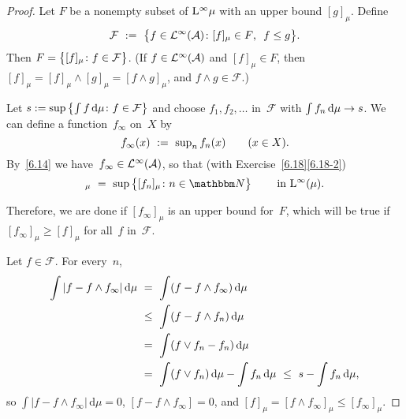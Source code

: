 \documentclass[main.tex]{subfiles}
\begin{document}
\begin{proof}
Let $F$ be a nonempty subset of $\mathrm{L}^\infty{\mu}$
with an upper bound $[g]_\mu$.
Define
\begin{equation*}
\mathcal{F}\ :=\ \bigl\{ f\in\mathcal{L}^\infty(\mathcal{A})\colon
  [f]_\mu\in F\text{, }\ f\leq g\bigr\}\text{.}
\end{equation*}
Then $F=\smash{\bigl\{[f]_\mu\colon f\in\mathcal F\bigr\}}$.
(If $f\in\mathcal{L}^\infty(\mathcal A)$ and $[f]_\mu\in F$,
then $[f]_\mu = [f]_\mu\wedge[g]_\mu = [f\wedge g]_\mu$,
and $f\wedge g\in\mathcal F$.)

Let $s:=\sup\smash{\bigl\{\int f\,\mathrm{d}\mu\colon
f\in\mathcal F\bigr\}}$ and choose $f_1,f_2,\dotsc$ in~$\mathcal F$
with $\int f_n\,\mathrm{d}\mu\rightarrow s$.
We can define a function~$f_\infty$ on~$X$ by
\begin{equation*}
f_\infty(x)\ :=\ \textstyle \sup_n f_n(x)\qquad(x\in X)\text{.}
\end{equation*}
By~\ref{6.14} we have~$f_\infty\in\mathcal{L}^\infty(\mathcal A)$,
so that (with Exercise~\ref{6.18}\ref{6.18-2})
\begin{equation*}
[f_\infty]_\mu\ =\ \sup\,\bigl\{[f_n]_\mu\colon n\in\N\bigr\}
\qquad\htam{ in }\BNL(\mu)\htam{.}
\end{equation*}

Therefore,
we are done if $[f_\infty]_\mu$
is an upper bound for~$F$,
which will be true if $[f_\infty]_\mu\geq [f]_\mu$
for all~$f$ in~$\mathcal F$.

Let $f\in\mathcal F$.
For every~$n$,
\begin{alignat*}{2}
\int |f-f\wedge f_\infty |\,\mathrm{d}\mu
\ &=\ \int (f-f\wedge f_\infty)\,\mathrm{d}\mu  \\
\ &\leq\ \int(f-f\wedge f_n)\,\mathrm{d}\mu \\
\ &=\ \int(f\vee f_n -f_n)\,\mathrm{d}\mu \\
\ &=\ \int(f\vee f_n)\,\mathrm{d}\mu 
      -\int f_n\,\mathrm{d}\mu
\ \leq\ s-\int f_n\,\mathrm{d}\mu\text{,}
\end{alignat*}
so $\int |f-f\wedge f_\infty|\,\mathrm{d}\mu=0$,
$[f-f\wedge f_\infty]=0$,
and $[f]_\mu= [f\wedge f_\infty]_\mu\leq [f_\infty]_\mu$. \xqed
\end{proof}
%
%
\end{document}

